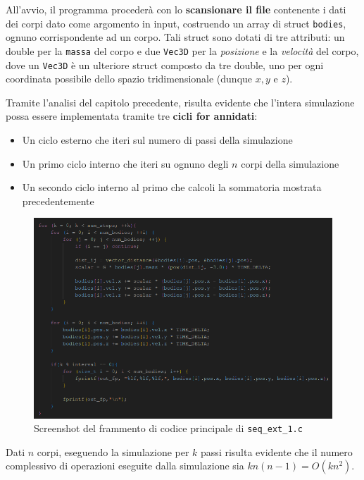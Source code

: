 \documentclass[12pt]{report}
\begin{document}
    All'avvio, il programma procederà con lo \textbf{scansionare il file} contenente i dati dei corpi dato come argomento in input, costruendo un array di struct \texttt{bodies}, ognuno corrispondente ad un corpo. Tali struct sono dotati di tre attributi: un double per la \texttt{massa} del corpo e due \texttt{Vec3D} per la \textit{posizione} e la \textit{velocità} del corpo, dove un \texttt{Vec3D} è un ulteriore struct composto da tre double, uno per ogni coordinata possibile dello spazio tridimensionale (dunque $x,y$ e $z$).

    Tramite l'analisi del capitolo precedente, risulta evidente che l'intera simulazione possa essere implementata tramite tre \textbf{cicli for annidati}:
    \begin{itemize}
        \item Un ciclo esterno che iteri sul numero di passi della simulazione
        \item Un primo ciclo interno che iteri su ognuno degli $n$ corpi della simulazione
        \item Un secondo ciclo interno al primo che calcoli la sommatoria mostrata precedentemente
    \end{itemize}

    \begin{figure}[h]
        \centering
        \includegraphics[width=\textwidth]{images/seq_ext_1.png}
        \caption{Screenshot del frammento di codice principale di \texttt{seq\_ext\_1.c}}
        \label{fig:seq_ext_1}
    \end{figure}

    \newpage

    Dati $n$ corpi, eseguendo la simulazione per $k$ passi risulta evidente che il numero complessivo di operazioni eseguite dalla simulazione sia $kn(n-1) = O(kn^2)$.
\end{document}
